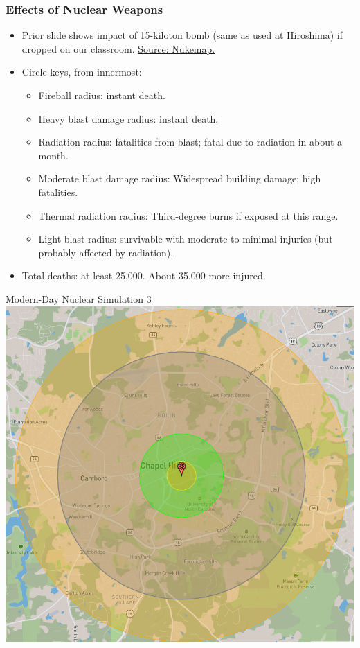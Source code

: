 \documentclass{beamer}
\begin{document}
\begin{frame} 
	\frametitle{\LARGE{Effects of Nuclear Weapons}}
	\begin{itemize}
		\item Prior slide shows impact of 15-kiloton bomb (same as used at Hiroshima) if dropped on our classroom. \href{https://nuclearsecrecy.com/nukemap/}{Source: Nukemap.} 
		\item Circle keys, from innermost: 	
		\begin{itemize}
			\item Fireball radius: instant death.
			\item Heavy blast damage radius: instant death.
			\item Radiation radius: fatalities from blast; fatal due to radiation in about a month.
			\item Moderate blast damage radius: Widespread building damage; high fatalities.
			\item Thermal radiation radius: Third-degree burns if exposed at this range.
			\item Light blast radius: survivable with moderate to minimal injuries (but probably affected by radiation).
		\end{itemize}
		\item Total deaths: at least 25,000. About 35,000 more injured.	
	\end{itemize}
\end{frame}

\begin{frame}{\LARGE Modern-Day Nuclear Simulation 3}
	\centering
	\includegraphics[width=\textwidth,height=0.9\textheight,keepaspectratio]{UNCnuke2.png}
\end{frame}
\end{document}
